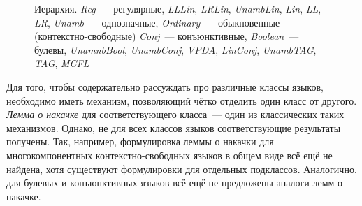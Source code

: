 \begin{figure}[h!]
\begin{center}
{
        }
    \end{center}
    \caption{Иерархия. \emph{Reg}~--- регулярные, \emph{LLLin}, \emph{LRLin}, \emph{UnambLin}, \emph{Lin}, \emph{LL}, \emph{LR}, \emph{Unamb}~--- однозначные, \emph{Ordinary}~--- обыкновенные (контекстно-свободные)
        \emph{Conj}~--- конъюнктивные, \emph{Boolean}~--- булевы, \emph{UnamnbBool}, \emph{UnambConj}, \emph{VPDA}, \emph{LinConj}, \emph{UnambTAG}, \emph{TAG}, \emph{MCFL}}
    \label{fig:hierarchyOkhotin}
\end{figure}

Для того, чтобы содержательно рассуждать про различные классы языков, необходимо иметь механизм, позволяющий чётко отделить один класс от другого.
\emph{Лемма о накачке} для соответствующего класса~--- один из классических таких механизмов.
Однако, не для всех классов языков соответствующие результаты получены.
Так, например, формулировка леммы о накачки для многокомпонентных контекстно-свободных языков в общем виде всё ещё не найдена, хотя существуют формулировки для отдельных подклассов.
Аналогично, для булевых и конъюнктивных языков всё ещё не предложены аналоги лемм о накачке.


